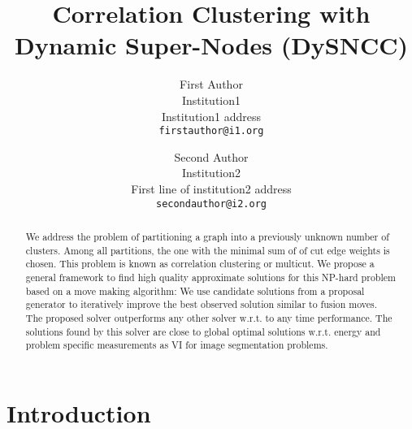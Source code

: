 \documentclass[10pt,twocolumn,letterpaper]{article}
\begin{document}

\title{Correlation Clustering with Dynamic Super-Nodes (DySNCC)}

\author{First Author\\
Institution1\\
Institution1 address\\
{\tt\small firstauthor@i1.org}
\and
Second Author\\
Institution2\\
First line of institution2 address\\
{\tt\small secondauthor@i2.org}
}

\maketitle


\listoftodos[Notes]
\begin{abstract}
   We address the problem of partitioning a  graph
   into a previously unknown number of clusters.
   Among all partitions, the one with the minimal 
   sum of of cut edge weights is chosen. 
   This problem is known as correlation clustering 
   or multicut.
   We propose a general framework to find
   high quality approximate solutions for 
   this NP-hard problem based on a move making algorithm:
   We use candidate solutions from a proposal generator
   to iteratively improve the best observed solution similar
   to fusion moves.
   The proposed solver outperforms any other solver
   w.r.t. to any time performance.
   The solutions found by this solver are close
   to global optimal solutions w.r.t. energy
   and problem specific measurements as VI for
   image segmentation problems.

\end{abstract}
\section{Introduction}

\end{document}
